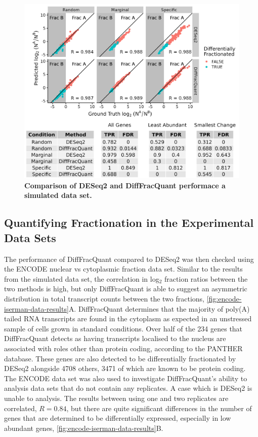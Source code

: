 \documentclass[../main.tex]{subfiles}
\begin{document}
\begin{figure}[h]

{\centering \includegraphics[width=1\linewidth]{figures/DESeq_vs_bayesian_combined.png} 

}

\caption[Simulated data performance.]{\textbf{Comparison of DESeq2 and DiffFracQuant performace a simulated data set.}} \label{fig:simulated-data-results}
\end{figure}

\subsection{Quantifying Fractionation in the Experimental Data Sets}

The performance of DiffFracQuant compared to DESeq2 was then checked using the ENCODE nuclear vs cytoplasmic fraction data set. 
Similar to the results from the simulated data set, the correlation in log$_2$ fraction ratios between the two methods is high, but only DiffFracQuant is able to suggest an asymmetric distribution in total transcript counts between the two fractions, \ref{fig:encode-iserman-data-results}A.
DiffFracQuant determines that the majority of poly(A) tailed RNA transcripts are found in the cytoplasm as expected in an unstressed sample of cells grown in standard conditions.
Over half of the 234 genes that DiffFracQuant detects as having transcripts localised to the nucleus are associated with roles other than protein coding, according to the PANTHER database. 
These genes are also detected to be differentially fractionated by DESeq2 alongside 4708 others, 3471 of which are known to be protein coding.
The ENCODE data set was also used to investigate DiffFracQuant's ability to analysis data sets that do not contain any replicates. 
A case which is DESeq2 is unable to analysis.
The results between using one and two replicates are correlated, $R = 0.84$, but there are quite significant differences in the number of genes that are determined to be differentially expressed, especially in low abundant genes, \ref{fig:encode-iserman-data-results}B.
\end{document}
